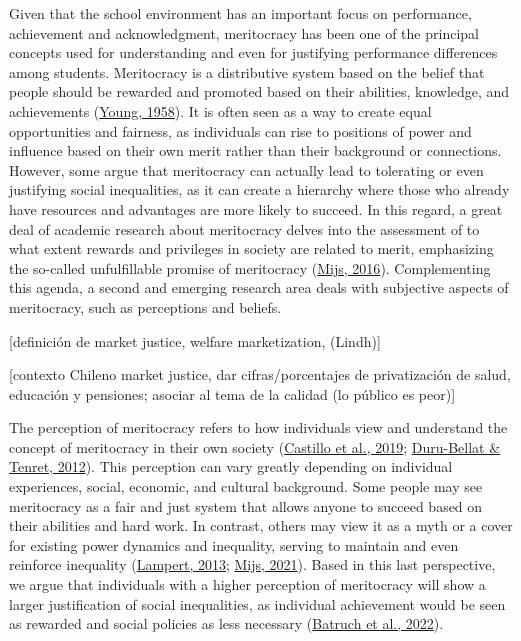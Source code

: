 \documentclass[
  letterpaper,
  DIV=11,
  numbers=noendperiod]{scrartcl}
\begin{document}
Given that the school environment has an important focus on performance,
achievement and acknowledgment, meritocracy has been one of the
principal concepts used for understanding and even for justifying
performance differences among students. Meritocracy is a distributive
system based on the belief that people should be rewarded and promoted
based on their abilities, knowledge, and achievements
(\protect\hyperlink{ref-young_rise_1958}{Young, 1958}). It is often seen
as a way to create equal opportunities and fairness, as individuals can
rise to positions of power and influence based on their own merit rather
than their background or connections. However, some argue that
meritocracy can actually lead to tolerating or even justifying social
inequalities, as it can create a hierarchy where those who already have
resources and advantages are more likely to succeed. In this regard, a
great deal of academic research about meritocracy delves into the
assessment of to what extent rewards and privileges in society are
related to merit, emphasizing the so-called unfulfillable promise of
meritocracy (\protect\hyperlink{ref-mijs_stratified_2016}{Mijs, 2016}).
Complementing this agenda, a second and emerging research area deals
with subjective aspects of meritocracy, such as perceptions and beliefs.

{[}definición de market justice, welfare marketization, (Lindh){]}

{[}contexto Chileno market justice, dar cifras/porcentajes de
privatización de salud, educación y pensiones; asociar al tema de la
calidad (lo público es peor){]}

The perception of meritocracy refers to how individuals view and
understand the concept of meritocracy in their own society
(\protect\hyperlink{ref-castillo_meritocracia_2019}{Castillo et al.,
2019}; \protect\hyperlink{ref-duru-bellat_who_2012}{Duru-Bellat \&
Tenret, 2012}). This perception can vary greatly depending on individual
experiences, social, economic, and cultural background. Some people may
see meritocracy as a fair and just system that allows anyone to succeed
based on their abilities and hard work. In contrast, others may view it
as a myth or a cover for existing power dynamics and inequality, serving
to maintain and even reinforce inequality
(\protect\hyperlink{ref-lampert_meritocratic_2013}{Lampert, 2013};
\protect\hyperlink{ref-mijs_paradox_2021}{Mijs, 2021}). Based in this
last perspective, we argue that individuals with a higher perception of
meritocracy will show a larger justification of social inequalities, as
individual achievement would be seen as rewarded and social policies as
less necessary (\protect\hyperlink{ref-batruch_belief_2022}{Batruch et
al., 2022}).
\end{document}
